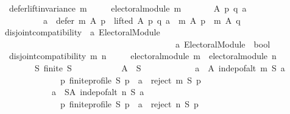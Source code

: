 \begin{isabellebody}
\ \ {\isachardoublequoteopen}defer{\isacharunderscore}{\kern0pt}lift{\isacharunderscore}{\kern0pt}invariance\ m\ {\isasymequiv}\isanewline
\ \ \ \ electoral{\isacharunderscore}{\kern0pt}module\ m\ {\isasymand}\isanewline
\ \ \ \ \ \ {\isacharparenleft}{\kern0pt}{\isasymforall}A\ p\ q\ a{\isachardot}{\kern0pt}\isanewline
\ \ \ \ \ \ \ \ \ \ {\isacharparenleft}{\kern0pt}a\ {\isasymin}\ {\isacharparenleft}{\kern0pt}defer\ m\ A\ p{\isacharparenright}{\kern0pt}\ {\isasymand}\ lifted\ A\ p\ q\ a{\isacharparenright}{\kern0pt}\ {\isasymlongrightarrow}\ m\ A\ p\ {\isacharequal}{\kern0pt}\ m\ A\ q{\isacharparenright}{\kern0pt}{\isachardoublequoteclose}\isanewline
\isanewline
\isanewline
{}\isamarkupfalse%
\ disjoint{\isacharunderscore}{\kern0pt}compatibility\ {\isacharcolon}{\kern0pt}{\isacharcolon}{\kern0pt}\ {\isachardoublequoteopen}{\isacharprime}{\kern0pt}a\ Electoral{\isacharunderscore}{\kern0pt}Module\ {\isasymRightarrow}\isanewline
\ \ \ \ \ \ \ \ \ \ \ \ \ \ \ \ \ \ \ \ \ \ \ \ \ \ \ \ \ \ \ \ \ \ \ \ \ \ \ \ \ {\isacharprime}{\kern0pt}a\ Electoral{\isacharunderscore}{\kern0pt}Module\ {\isasymRightarrow}\ bool{\isachardoublequoteclose}\ \isanewline
\ \ {\isachardoublequoteopen}disjoint{\isacharunderscore}{\kern0pt}compatibility\ m\ n\ {\isasymequiv}\isanewline
\ \ \ \ electoral{\isacharunderscore}{\kern0pt}module\ m\ {\isasymand}\ electoral{\isacharunderscore}{\kern0pt}module\ n\ {\isasymand}\isanewline
\ \ \ \ \ \ \ \ {\isacharparenleft}{\kern0pt}{\isasymforall}S{\isachardot}{\kern0pt}\ finite\ S\ {\isasymlongrightarrow}\isanewline
\ \ \ \ \ \ \ \ \ \ {\isacharparenleft}{\kern0pt}{\isasymexists}A\ {\isasymsubseteq}\ S{\isachardot}{\kern0pt}\isanewline
\ \ \ \ \ \ \ \ \ \ \ \ {\isacharparenleft}{\kern0pt}{\isasymforall}a\ {\isasymin}\ A{\isachardot}{\kern0pt}\ indep{\isacharunderscore}{\kern0pt}of{\isacharunderscore}{\kern0pt}alt\ m\ S\ a\ {\isasymand}\isanewline
\ \ \ \ \ \ \ \ \ \ \ \ \ \ {\isacharparenleft}{\kern0pt}{\isasymforall}p{\isachardot}{\kern0pt}\ finite{\isacharunderscore}{\kern0pt}profile\ S\ p\ {\isasymlongrightarrow}\ a\ {\isasymin}\ reject\ m\ S\ p{\isacharparenright}{\kern0pt}{\isacharparenright}{\kern0pt}\ {\isasymand}\isanewline
\ \ \ \ \ \ \ \ \ \ \ \ {\isacharparenleft}{\kern0pt}{\isasymforall}a\ {\isasymin}\ S{\isacharminus}{\kern0pt}A{\isachardot}{\kern0pt}\ indep{\isacharunderscore}{\kern0pt}of{\isacharunderscore}{\kern0pt}alt\ n\ S\ a\ {\isasymand}\isanewline
\ \ \ \ \ \ \ \ \ \ \ \ \ \ {\isacharparenleft}{\kern0pt}{\isasymforall}p{\isachardot}{\kern0pt}\ finite{\isacharunderscore}{\kern0pt}profile\ S\ p\ {\isasymlongrightarrow}\ a\ {\isasymin}\ reject\ n\ S\ p{\isacharparenright}{\kern0pt}{\isacharparenright}{\kern0pt}{\isacharparenright}{\kern0pt}{\isacharparenright}{\kern0pt}{\isachardoublequoteclose}\isanewline

\end{isabellebody}
